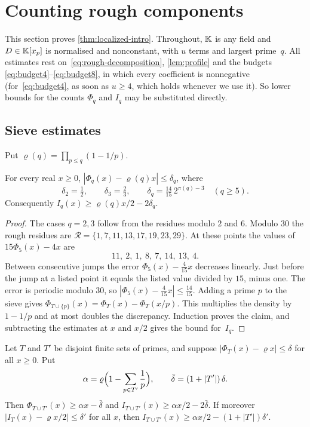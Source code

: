 \section{Counting rough components}\label{sec:counting}

This section proves \cref{thm:localized-intro}. Throughout, $\mathbb{K}$ is any field and $D\in\mathbb{K}[x_p]$ is normalised and nonconstant, with $u$ terms and largest prime~$q$. All estimates rest on~\eqref{eq:rough-decomposition}, \cref{lem:profile} and the budgets \eqref{eq:budget4}--\eqref{eq:budget8}, in which every coefficient is nonnegative (for~\eqref{eq:budget4}, as soon as $u\ge4$, which holds whenever we use it). So lower bounds for the counts $\Phi_q$ and $I_q$ may be substituted directly.

\subsection{Sieve estimates}
Put $\varrho(q)=\prod_{p\le q}(1-1/p)$.

\begin{lemma}[Discrepancy]\label{lem:discrepancy}
For every real $x\ge0$, $|\Phi_q(x)-\varrho(q)x|\le \delta_q$, where
\[
 \delta_2=\tfrac12,\qquad \delta_3=\tfrac23,\qquad \delta_q=\tfrac{14}{15}\,2^{\pi(q)-3}\quad(q\ge5).
\]
Consequently $I_q(x)\ge\varrho(q)x/2-2\delta_q$.
\end{lemma}

\begin{proof}
The cases $q=2,3$ follow from the residues modulo $2$ and $6$. Modulo $30$ the rough residues are $\mathcal R=\{1,7,11,13,17,19,23,29\}$. At these points the values of $15\Phi_5(x)-4x$ are
\[
 11,\ 2,\ 1,\ 8,\ 7,\ 14,\ 13,\ 4 .
\]
Between consecutive jumps the error $\Phi_5(x)-\frac4{15}x$ decreases linearly. Just before the jump at a listed point it equals the listed value divided by $15$, minus one. The error is periodic modulo $30$, so $|\Phi_5(x)-\frac4{15}x|\le\frac{14}{15}$. Adding a prime $p$ to the sieve gives $\Phi_{T\cup\{p\}}(x)=\Phi_T(x)-\Phi_T(x/p)$. This multiplies the density by $1-1/p$ and at most doubles the discrepancy. Induction proves the claim, and subtracting the estimates at $x$ and $x/2$ gives the bound for~$I_q$.
\end{proof}

\begin{lemma}\label{lem:one-step}
Let $T$ and $T'$ be disjoint finite sets of primes, and suppose $|\Phi_T(x)-\varrho x|\le \delta$ for all $x\ge0$. Put
\[
 \alpha=\varrho\Bigl(1-\sum_{p\in T'}\frac1p\Bigr),\qquad \bar\delta=(1+|T'|)\,\delta .
\]
Then $\Phi_{T\cup T'}(x)\ge\alpha x-\bar\delta$ and $I_{T\cup T'}(x)\ge\alpha x/2-2\bar\delta$. If moreover $|I_T(x)-\varrho x/2|\le \delta'$ for all $x$, then $I_{T\cup T'}(x)\ge\alpha x/2-(1+|T'|)\delta'$.
\end{lemma}

